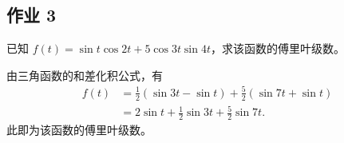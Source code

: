 \subsection{作业 3}

\begin{homework}
    已知 $f(t) = \sin t\cos 2t + 5\cos 3t \sin 4t$，求该函数的傅里叶级数。
\end{homework}

\begin{solution}
    由三角函数的和差化积公式，有
    \begin{align*}
        f(t) & = \frac{1}{2}\left(\sin 3t - \sin t\right) + \frac{5}{2}\left(\sin 7t + \sin t\right) \\
        & = 2\sin t + \frac{1}{2}\sin 3t + \frac{5}{2}\sin 7t.
    \end{align*}
    此即为该函数的傅里叶级数。
\end{solution}
